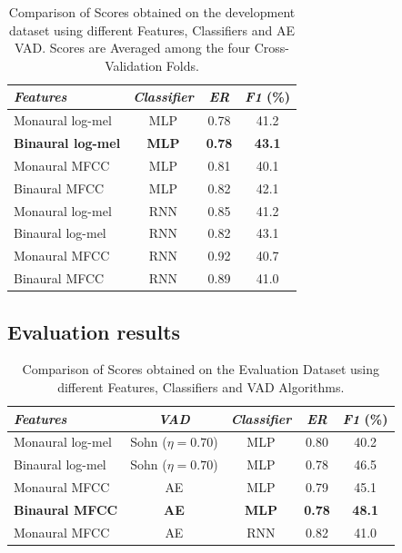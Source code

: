 \begin{table}
	\caption{Comparison of Scores obtained on the development dataset using different Features, Classifiers and AE VAD. Scores are Averaged among the four Cross-Validation Folds.}
	\label{tab:dev_results_ae}
	\centering
	\begin{tabular}{l c c c}\toprule
		\emph{Features} & \emph{Classifier} & \emph{ER} & \emph{F1} (\%)\\
		\midrule
		Monaural log-mel & MLP & 0.78 & 41.2\\
		\textbf{Binaural log-mel} & \textbf{MLP} & \textbf{0.78} & \textbf{43.1}\\
		\midrule
		Monaural MFCC & MLP & 0.81 & 40.1\\
		Binaural MFCC & MLP & 0.82 & 42.1\\
		\midrule
		Monaural log-mel & RNN & 0.85 & 41.2\\
		Binaural log-mel & RNN & 0.82 & 43.1\\
		\midrule
		Monaural MFCC & RNN & 0.92 & 40.7\\
		Binaural MFCC & RNN & 0.89 & 41.0\\
		\bottomrule
	\end{tabular}
\end{table}

\subsection{Evaluation results}

\begin{table}
	\caption{Comparison of Scores obtained on the Evaluation Dataset using different Features, Classifiers and VAD Algorithms.}
	\label{tab:eval_results}
	\centering
	\begin{tabular}{l c c c c}\toprule
		\emph{Features} & \emph{VAD} & \emph{Classifier} & \emph{ER} & \emph{F1} (\%)\\
		\midrule
		Monaural log-mel & Sohn ($\eta=0.70$) & MLP & 0.80 & 40.2\\
		Binaural log-mel & Sohn ($\eta=0.70$) & MLP & 0.78 & 46.5\\
		\midrule
		Monaural MFCC & AE & MLP & 0.79 & 45.1\\
		\textbf{Binaural MFCC} & \textbf{AE} & \textbf{MLP} & \textbf{0.78} & \textbf{48.1}\\
		\midrule
		Monaural MFCC & AE & RNN & 0.82 & 41.0\\
		\bottomrule
	\end{tabular}
\end{table}

